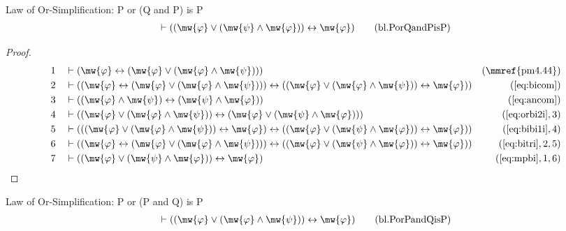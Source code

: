 \begin{lemma} Law of Or-Simplification: P or (Q
and P) is P
\begin{align}
\vdash ( ( \mw{\varphi} \vee ( \mw{\psi} \wedge \mw{\varphi} ) )
    \leftrightarrow \mw{\varphi} )\label{eq:bl.PorQandPisP}\tag{bl.PorQandPisP}
\end{align}
\end{lemma}

\begin{proof}
\begin{align}
  1 &&  & \vdash ( \mw{\varphi} \leftrightarrow ( \mw{\varphi} \vee ( \mw{\varphi} \wedge \mw{\psi} ) ) )&(\mbox{\mmref{pm4.44}})\notag
  \\ 2 &&  & \vdash ( ( \mw{\varphi} \leftrightarrow ( \mw{\varphi} \vee ( \mw{\varphi} \wedge \mw{\psi} ) ) ) \leftrightarrow ( ( \mw{\varphi} \vee ( \mw{\varphi} \wedge \mw{\psi} ) ) \leftrightarrow \mw{\varphi} ) )&(\mbox{\ref{eq:bicom}})\notag
  \\ 3 &&  & \vdash ( ( \mw{\varphi} \wedge \mw{\psi} ) \leftrightarrow ( \mw{\psi} \wedge \mw{\varphi} ) )&(\mbox{\ref{eq:ancom}})\notag
  \\ 4 &&  & \vdash ( ( \mw{\varphi} \vee ( \mw{\varphi} \wedge \mw{\psi} ) ) \leftrightarrow ( \mw{\varphi} \vee ( \mw{\psi} \wedge \mw{\varphi} ) ) )&(\mbox{\ref{eq:orbi2i}},3)\notag
  \\ 5 &&  & \vdash ( ( ( \mw{\varphi} \vee ( \mw{\varphi} \wedge \mw{\psi} ) ) \leftrightarrow \mw{\varphi} ) \leftrightarrow ( ( \mw{\varphi} \vee ( \mw{\psi} \wedge \mw{\varphi} ) ) \leftrightarrow \mw{\varphi} ) )&(\mbox{\ref{eq:bibi1i}},4)\notag
  \\ 6 &&  & \vdash ( ( \mw{\varphi} \leftrightarrow ( \mw{\varphi} \vee ( \mw{\varphi} \wedge \mw{\psi} ) ) ) \leftrightarrow ( ( \mw{\varphi} \vee ( \mw{\psi} \wedge \mw{\varphi} ) ) \leftrightarrow \mw{\varphi} ) )&(\mbox{\ref{eq:bitri}},2,5)\notag
  \\ 7 &&  & \vdash ( ( \mw{\varphi} \vee ( \mw{\psi} \wedge \mw{\varphi} ) ) \leftrightarrow \mw{\varphi} )&(\mbox{\ref{eq:mpbi}},1,6)\notag
\end{align}
\end{proof}

\begin{lemma} Law of Or-Simplification: P or (P
and Q) is P
\begin{align}
\vdash ( ( \mw{\varphi} \vee ( \mw{\varphi} \wedge \mw{\psi} ) )
    \leftrightarrow \mw{\varphi} )\label{eq:bl.PorPandQisP}\tag{bl.PorPandQisP}
\end{align}
\end{lemma}

